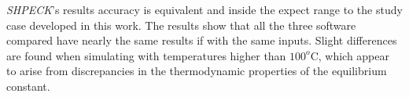 \emph{SHPECK}'s results accuracy is equivalent and inside the expect range to the study case developed in this work. The results show that all the three software compared have nearly the same results if with the same inputs. Slight differences are found when simulating with temperatures higher than $100^o$C, which appear to arise from discrepancies in the thermodynamic properties of the equilibrium constant.


\newpage



